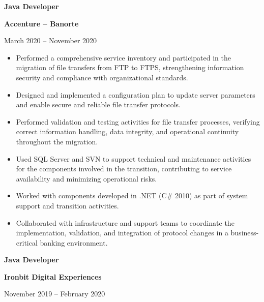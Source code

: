 \documentclass[10pt,letterpaper]{article}
\newcommand{\jobtitle}[1]{
    {\bfseries #1}
}
\newcommand{\company}[1]{
    {\bfseries\color{DarkGray} #1}
}
\newcommand{\jobdate}[1]{
    {\color{MediumGray} #1}
}
\begin{document}

\jobtitle{Java Developer} \textbar{}
\company{Accenture -- Banorte}
\hfill \textbar{}
\jobdate{March 2020 -- November 2020}

\begin{itemize}

    \item Performed a comprehensive service inventory and participated in the migration of file transfers from FTP to FTPS, strengthening information security and compliance with organizational standards.

    \item Designed and implemented a configuration plan to update server parameters and enable secure and reliable file transfer protocols.

    \item Performed validation and testing activities for file transfer processes, verifying correct information handling, data integrity, and operational continuity throughout the migration.

    \item Used SQL Server and SVN to support technical and maintenance activities for the components involved in the transition, contributing to service availability and minimizing operational risks.

    \item Worked with components developed in .NET (C# 2010) as part of system support and transition activities.

    \item Collaborated with infrastructure and support teams to coordinate the implementation, validation, and integration of protocol changes in a business-critical banking environment.

\end{itemize}


\jobtitle{Java Developer} \textbar{}
\company{Ironbit Digital Experiences}
\hfill \textbar{}
\jobdate{November 2019 -- February 2020}
\end{document}
